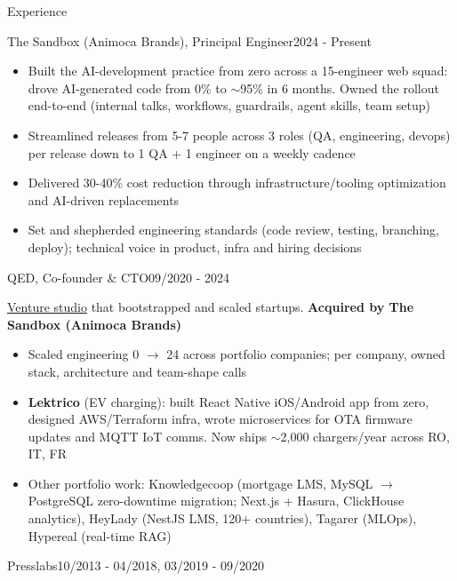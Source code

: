 \documentclass{resume}
\begin{document}
\begin{rSection}{Experience}
    \begin{rSubsection}{The Sandbox (Animoca Brands), Principal Engineer}{2024 - Present}{}{}
        \begin{itemize}
            \setlength\itemsep{-0.4em}
            \item Built the AI-development practice from zero across a 15-engineer web squad: drove AI-generated code from 0\% to $\sim$95\% in 6 months. Owned the rollout end-to-end (internal talks, workflows, guardrails, agent skills, team setup)
            \item Streamlined releases from 5-7 people across 3 roles (QA, engineering, devops) per release down to 1 QA + 1 engineer on a weekly cadence
            \item Delivered 30-40\% cost reduction through infrastructure/tooling optimization and AI-driven replacements
            \item Set and shepherded engineering standards (code review, testing, branching, deploy); technical voice in product, infra and hiring decisions
        \end{itemize}
    \end{rSubsection}
    \begin{rSubsection}{QED, Co-founder \& CTO}{09/2020 - 2024}{}{}
        \item \href{https://qed.builders}{Venture studio} that bootstrapped and scaled startups. \textbf{Acquired by The Sandbox (Animoca Brands)}
        \begin{itemize}
            \setlength\itemsep{-0.4em}
            \item Scaled engineering 0 $\rightarrow$ 24 across portfolio companies; per company, owned stack, architecture and team-shape calls
            \item \textbf{Lektrico} (EV charging): built React Native iOS/Android app from zero, designed AWS/Terraform infra, wrote microservices for OTA firmware updates and MQTT IoT comms. Now ships $\sim$2,000 chargers/year across RO, IT, FR
            \item Other portfolio work: Knowledgecoop (mortgage LMS, MySQL $\rightarrow$ PostgreSQL zero-downtime migration; Next.js + Hasura, ClickHouse analytics), HeyLady (NestJS LMS, 120+ countries), Tagarer (MLOps), Hypereal (real-time RAG)
        \end{itemize}
    \end{rSubsection}
    \begin{rSubsection}{Presslabs}{10/2013 - 04/2018, 03/2019 - 09/2020}{}{}

\end{rSubsection}
\end{rSection}
\end{document}
